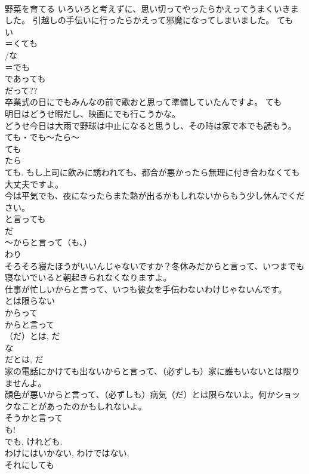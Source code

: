 \documentclass[8pt]{extreport}
\begin{document}
\begin{CJK}{UTF8}{min}
\\	野菜を育てる いろいろと考えずに、思い切ってやったらかえってうまくいきました。 引越しの手伝いに行ったらかえって邪魔になってしまいました。 ても 
\\	い
\\	＝くても 
\\	/な
\\	＝でも 
\\	であっても 
\\	だって?? 
\\	卒業式の日にでもみんなの前で歌おと思って準備していたんですよ。 ても 
\\	明日はどうせ暇だし、映画にでも行こうかな。 
\\	どうせ今日は大雨で野球は中止になると思うし、その時は家で本でも読もう。 
\\	ても・でも～たら～ 
\\	ても 
\\	たら 
\\	ても. もし上司に飲みに誘われても、都合が悪かったら無理に付き合わなくても大丈夫ですよ。 
\\	今は平気でも、夜になったらまた熱が出るかもしれないからもう少し休んでください。 
\\	と言っても
\\	だ 
\\	～からと言って（も、） 
\\	わり 
\\	そろそろ寝たほうがいいんじゃないですか？冬休みだからと言って、いつまでも寝ないでいると朝起きられなくなりますよ。 
\\	仕事が忙しいからと言って、いつも彼女を手伝わないわけじゃないんです。 
\\	とは限らない 
\\	からって 
\\	からと言って 
\\	（だ）とは, だ 
\\	な
\\	だとは, だ 
\\	家の電話にかけても出ないからと言って、（必ずしも）家に誰もいないとは限りませんよ。 
\\	顔色が悪いからと言って、（必ずしも）病気（だ）とは限らないよ。何かショックなことがあったのかもしれないよ。 
\\	そうかと言って 
\\	も! 
\\	でも, けれども. 
\\	わけにはいかない, わけではない, 
\\	それにしても 

\end{CJK}
\end{document}
